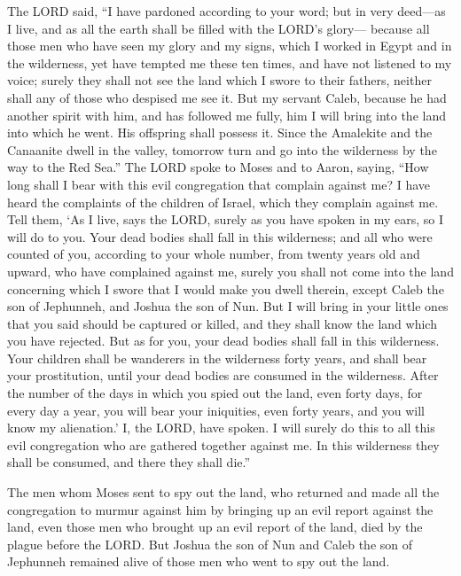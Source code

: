  The LORD said, ``I have pardoned according to your word;
 but in very deed---as I live, and as all the earth shall
be filled with the LORD's glory---  because all those men
who have seen my glory and my signs, which I worked in Egypt and in the
wilderness, yet have tempted me these ten times, and have not listened
to my voice;  surely they shall not see the land which I
swore to their fathers, neither shall any of those who despised me see
it.  But my servant Caleb, because he had another spirit
with him, and has followed me fully, him I will bring into the land into
which he went. His offspring shall possess it.  Since the
Amalekite and the Canaanite dwell in the valley, tomorrow turn and go
into the wilderness by the way to the Red Sea.''  The LORD
spoke to Moses and to Aaron, saying,  ``How long shall I
bear with this evil congregation that complain against me? I have heard
the complaints of the children of Israel, which they complain against
me.  Tell them, `As I live, says the LORD, surely as you
have spoken in my ears, so I will do to you.  Your dead
bodies shall fall in this wilderness; and all who were counted of you,
according to your whole number, from twenty years old and upward, who
have complained against me,  surely you shall not come into
the land concerning which I swore that I would make you dwell therein,
except Caleb the son of Jephunneh, and Joshua the son of Nun.
 But I will bring in your little ones that you said should
be captured or killed, and they shall know the land which you have
rejected.  But as for you, your dead bodies shall fall in
this wilderness.  Your children shall be wanderers in the
wilderness forty years, and shall bear your prostitution, until your
dead bodies are consumed in the wilderness.  After the
number of the days in which you spied out the land, even forty days, for
every day a year, you will bear your iniquities, even forty years, and
you will know my alienation.'  I, the LORD, have spoken. I
will surely do this to all this evil congregation who are gathered
together against me. In this wilderness they shall be consumed, and
there they shall die.''

 The men whom Moses sent to spy out the land, who returned
and made all the congregation to murmur against him by bringing up an
evil report against the land,  even those men who brought
up an evil report of the land, died by the plague before the LORD.
 But Joshua the son of Nun and Caleb the son of Jephunneh
remained alive of those men who went to spy out the land.

